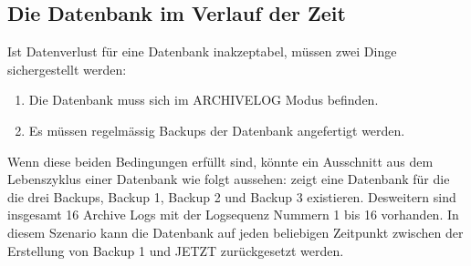       \subsection{Die Datenbank im Verlauf der Zeit}
        Ist Datenverlust für eine Datenbank inakzeptabel, müssen zwei Dinge sichergestellt werden:
        \begin{enumerate}
          \item Die Datenbank muss sich im ARCHIVELOG Modus befinden.
          \item Es müssen regelmässig Backups der Datenbank angefertigt werden.
        \end{enumerate}
        Wenn diese beiden Bedingungen erfüllt sind, könnte ein Ausschnitt aus dem Lebenszyklus einer Datenbank wie folgt aussehen:
         zeigt eine Datenbank für die die drei Backups, Backup 1, Backup 2 und Backup 3 existieren. Desweitern sind insgesamt 16 Archive Logs mit der Logsequenz Nummern 1 bis 16 vorhanden. In diesem Szenario kann die Datenbank auf jeden beliebigen Zeitpunkt zwischen der Erstellung von Backup 1 und JETZT zurückgesetzt werden.

